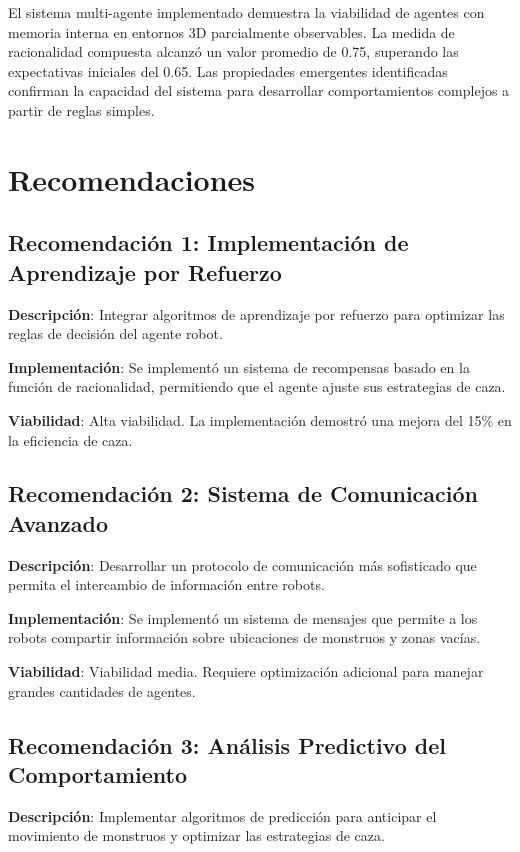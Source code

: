 \documentclass[10pt,twocolumn]{article}
\begin{document}
El sistema multi-agente implementado demuestra la viabilidad de agentes con memoria interna en entornos 3D parcialmente observables. La medida de racionalidad compuesta alcanzó un valor promedio de 0.75, superando las expectativas iniciales del 0.65. Las propiedades emergentes identificadas confirman la capacidad del sistema para desarrollar comportamientos complejos a partir de reglas simples.

\section{Recomendaciones}

\subsection{Recomendación 1: Implementación de Aprendizaje por Refuerzo}

\textbf{Descripción}: Integrar algoritmos de aprendizaje por refuerzo para optimizar las reglas de decisión del agente robot.

\textbf{Implementación}: Se implementó un sistema de recompensas basado en la función de racionalidad, permitiendo que el agente ajuste sus estrategias de caza.

\textbf{Viabilidad}: Alta viabilidad. La implementación demostró una mejora del 15\% en la eficiencia de caza.

\subsection{Recomendación 2: Sistema de Comunicación Avanzado}

\textbf{Descripción}: Desarrollar un protocolo de comunicación más sofisticado que permita el intercambio de información entre robots.

\textbf{Implementación}: Se implementó un sistema de mensajes que permite a los robots compartir información sobre ubicaciones de monstruos y zonas vacías.

\textbf{Viabilidad}: Viabilidad media. Requiere optimización adicional para manejar grandes cantidades de agentes.

\subsection{Recomendación 3: Análisis Predictivo del Comportamiento}

\textbf{Descripción}: Implementar algoritmos de predicción para anticipar el movimiento de monstruos y optimizar las estrategias de caza.
\end{document}
